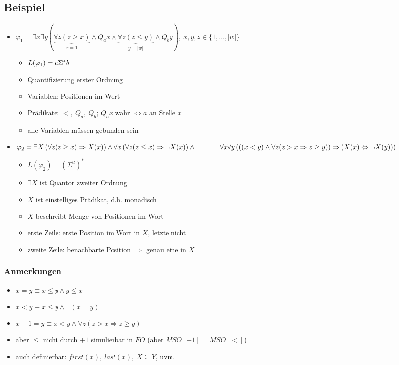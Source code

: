     \subsection{Beispiel}
        \begin{itemize}
            \item $\varphi_1=\exists x\exists y( \underbrace{\forall z (z\geq x)}_{x=1}\wedge Q_ax\wedge \underbrace{\forall z(z\leq y)}_{y=|w|}\wedge Q_by),\ x,y,z\in\{1,\dots,|w|\}$
            \begin{itemize}
                \item $L(\varphi_1)=a\Sigma^* b$
                \item Quantifizierung erster Ordnung
                \item Variablen: Positionen im Wort
                \item Prädikate: $<,\ Q_a,\ Q_b$; $Q_ax$ wahr $\Leftrightarrow a$ an Stelle $x$
                \item alle Variablen müssen gebunden sein
            \end{itemize}
            \item $\varphi_2=\exists X\left(\forall z(z\geq x)\Rightarrow X(x)\right)\wedge \forall x\left(\forall z(z\leq x)\Rightarrow \neg X(x)\right)\wedge\\\hspace*{1.2cm} \forall x\forall y\left(\left((x<y)\wedge\forall z (z>x\Rightarrow z\geq y)\right)\Rightarrow\left(X(x)\Leftrightarrow \neg X(y)\right)\right)$
            \begin{itemize}
                \item $L(\varphi_2)=\left(\Sigma^2\right)^*$
                \item $\exists X$ ist Quantor zweiter Ordnung
                \item $X$ ist einstelliges Prädikat, d.h. monadisch
                \item $X$ beschreibt Menge von Positionen im Wort
                \item erste Zeile: erste Position im Wort in $X$, letzte nicht
                \item zweite Zeile: benachbarte Position $\Rightarrow$ genau eine in $X$
            \end{itemize}
        \end{itemize}
        \subsubsection{Anmerkungen}
            \begin{itemize}
                \item $x=y\equiv x\le y\wedge y\le x$
                \item $x<y\equiv x\le y\wedge \neg(x=y)$
                \item $x+1=y\equiv x<y\wedge\forall z(z>x\Rightarrow z\geq y)$
                \item aber $\leq$ nicht durch $+1$ simulierbar in $FO$ (aber $MSO[+1]=MSO[<]$)
                \item auch definierbar: $first(x),\ last(x),\ X\subseteq Y$, uvm.
            \end{itemize}
